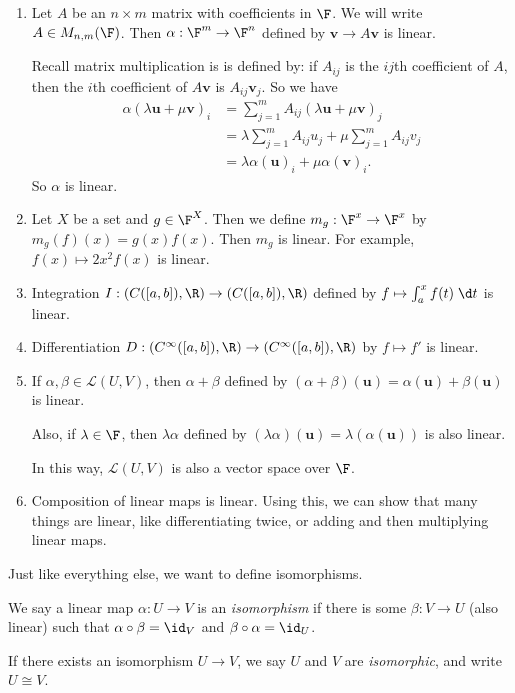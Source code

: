 \documentclass[a4paper]{article}
\begin{document}
\begin{eg}\leavevmode
  \begin{enumerate}
    \item Let $A$ be an $n\times m$ matrix with coefficients in $\F$. We will write $A\in M_{n, m}(\F)$. Then $\alpha: \F^m \to \F^n$ defined by $\mathbf{v}\to A\mathbf{v}$ is linear.

      Recall matrix multiplication is is defined by: if $A_{ij}$ is the $ij$th coefficient of $A$, then the $i$th coefficient of $A\mathbf{v}$ is $A_{ij}\mathbf{v}_j$. So we have
      \begin{align*}
        \alpha(\lambda \mathbf{u} + \mu \mathbf{v})_i &= \sum_{j = 1}^m A_{ij}(\lambda \mathbf{u} + \mu \mathbf{v})_j \\
        &= \lambda \sum_{j = 1}^m A_{ij}u_j + \mu \sum_{j = 1}^m A_{ij} v_j \\
        &= \lambda \alpha(\mathbf{u})_i + \mu \alpha(\mathbf{v})_i.
      \end{align*}
      So $\alpha$ is linear.
    \item Let $X$ be a set and $g\in \F^X$. Then we define $m_g: \F^x \to \F^x$ by $m_g(f)(x) = g(x) f(x)$. Then $m_g$ is linear. For example, $f(x) \mapsto 2x^2 f(x)$ is linear.
    \item Integration $I: (C([a, b]), \R) \to (C([a, b]), \R)$ defined by $f\mapsto \int_a^x f(t) \;\d t$ is linear.
    \item Differentiation $D: (C^\infty ([a, b]), \R) \to (C^\infty ([a, b]), \R)$ by $ f\mapsto f'$ is linear.
    \item If $\alpha, \beta\in \mathcal{L}(U, V)$, then $\alpha + \beta$ defined by $(\alpha + \beta)(\mathbf{u}) = \alpha(\mathbf{u}) + \beta(\mathbf{u})$ is linear.

      Also, if $\lambda \in \F$, then $\lambda \alpha$ defined by $(\lambda \alpha)(\mathbf{u}) = \lambda (\alpha (\mathbf{u}))$ is also linear.

      In this way, $\mathcal{L}(U, V)$ is also a vector space over $\F$.
    \item Composition of linear maps is linear. Using this, we can show that many things are linear, like differentiating twice, or adding and then multiplying linear maps.
  \end{enumerate}
\end{eg}

Just like everything else, we want to define isomorphisms.
\begin{defi}[Isomorphism]
  We say a linear map $\alpha: U\to V$ is an \emph{isomorphism} if there is some $\beta: V\to U$ (also linear) such that $\alpha \circ \beta = \id_V$ and $\beta\circ \alpha = \id_U$.

  If there exists an isomorphism $U\to V$, we say $U$ and $V$ are \emph{isomorphic}, and write $U\cong V$.
\end{defi}
\end{document}
